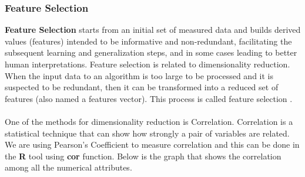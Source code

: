 \documentclass[fleqn,10pt]{SelfArx} %
\begin{document}
\subsubsection{Feature Selection}
\textbf{Feature Selection} starts from an initial set of measured data and builds derived values (features) intended to be informative and non-redundant, facilitating the subsequent learning and generalization steps, and in some cases leading to better human interpretations. Feature selection is related to dimensionality reduction.
When the input data to an algorithm is too large to be processed and it is suspected to be redundant, then it can be transformed into a reduced set of features (also named a features vector). This process is called feature selection \cite{REF:5}.
\\ \\One of the methods for dimensionality reduction is Correlation. Correlation is a statistical technique that can show how strongly a pair of variables are related.
\\ We are using Pearson's Coefficient to measure correlation and this can be done in the \textbf{R} tool using \textbf{cor} function. Below is the graph that shows the correlation among all the numerical attributes.
\end{document}
